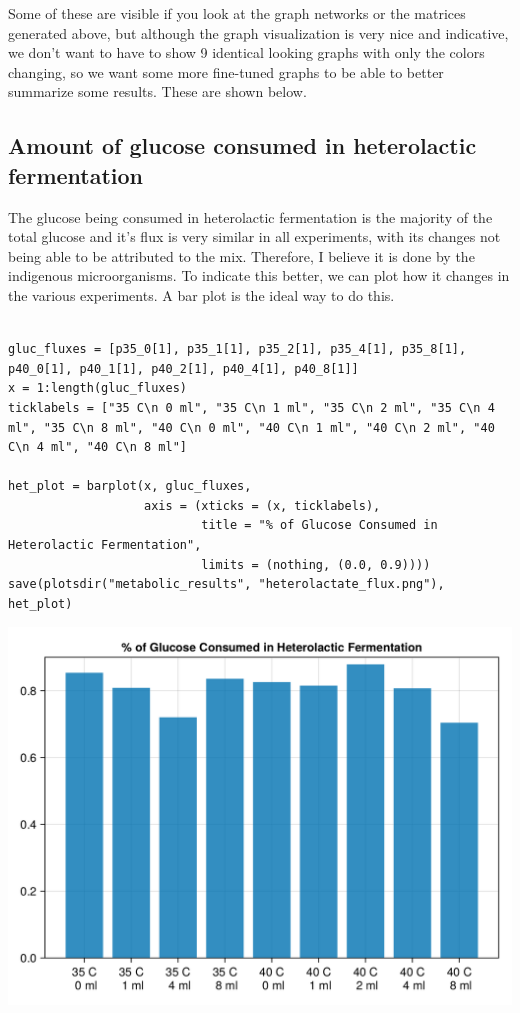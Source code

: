 \documentclass[11pt]{article}
\begin{document}
Some of these are visible if you look at the graph networks or the matrices generated above, but although the graph visualization is very nice and indicative, we don't want to have to show 9 identical looking graphs with only the colors changing, so we want some more fine-tuned graphs to be able to better summarize some results. These are shown below.

\subsection{Amount of glucose consumed in heterolactic fermentation}
\label{sec:org520486d}
The glucose being consumed in heterolactic fermentation is the majority of the total glucose and it's flux is very similar in all experiments, with its changes not being able to be attributed to the mix. Therefore, I believe it is done by the indigenous microorganisms. To indicate this better, we can plot how it changes in the various experiments. A bar plot is the ideal way to do this.

\begin{verbatim}

gluc_fluxes = [p35_0[1], p35_1[1], p35_2[1], p35_4[1], p35_8[1], p40_0[1], p40_1[1], p40_2[1], p40_4[1], p40_8[1]]
x = 1:length(gluc_fluxes)
ticklabels = ["35 C\n 0 ml", "35 C\n 1 ml", "35 C\n 2 ml", "35 C\n 4 ml", "35 C\n 8 ml", "40 C\n 0 ml", "40 C\n 1 ml", "40 C\n 2 ml", "40 C\n 4 ml", "40 C\n 8 ml"]

het_plot = barplot(x, gluc_fluxes,
                   axis = (xticks = (x, ticklabels),
                           title = "% of Glucose Consumed in Heterolactic Fermentation",
                           limits = (nothing, (0.0, 0.9))))
save(plotsdir("metabolic_results", "heterolactate_flux.png"), het_plot)
\end{verbatim}

\begin{center}
\includegraphics[width=.9\linewidth]{../plots/metabolic_results/heterolactate_flux.png}
\end{center}
\end{document}
